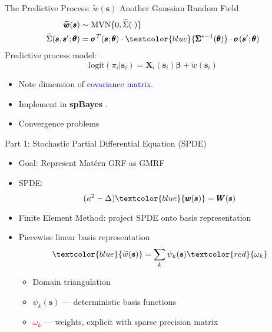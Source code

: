 \documentclass{beamer}
\begin{document}
\begin{frame}[fragile]{The Predictive Process: $\widetilde{w}(\pmb{s})$}
Another Gaussian Random Field
\begin{align*}
\widetilde{\pmb{w}}(\pmb{s}) &\sim \text{MVN}\{0, \widetilde{\Sigma}(\cdot)\} \\
\widetilde{\Sigma}(\pmb{s}, \pmb{s}'; \pmb{\theta}) &= \pmb{\sigma}^{T}(\pmb{s};\pmb{\theta}) \cdot \textcolor{blue}{\pmb{\Sigma}^{*-1}(\pmb{\theta})} \cdot \pmb{\sigma}(\pmb{s}';\pmb{\theta})
\end{align*}
Predictive process model:
    \begin{equation}
    \text{logit}(\pi_{i}|\pmb{s}_{i}) = \pmb{X}_{i}(\pmb{s}_{i}) \pmb{\beta} + \widetilde{w}(\pmb{s}_{i}) \nonumber
    \end{equation}
    \begin{itemize}
    \item Note dimension of \textcolor{blue}{covariance matrix}.
    \item Implement in {\bf spBayes} \citep{Finley2013}.
    \item Convergence problems
    \end{itemize}
\end{frame}

\begin{frame}{Part 1: Stochastic Partial Differential Equation (SPDE)}{\citep{Lindgren2011}}

\begin{itemize}
\addtolength{\itemsep}{0.5\baselineskip}
\item Goal: Represent Mat\'ern GRF as GMRF
\item SPDE:
$$ (\kappa^{2} - \Delta)\textcolor{blue}{\pmb{w}(\pmb{s})} = \pmb{W}(\pmb{s})$$
\item Finite Element Method: project SPDE onto basis representation
\item Piecewise linear basis representation
$$ \textcolor{blue}{\widetilde{w}(\pmb{s})} = \sum_{k} \psi_{k}(\pmb{s})\textcolor{red}{\omega_{k}}$$
        \begin{itemize}
        \addtolength{\itemsep}{0.5\baselineskip}
        \item Domain triangulation
        \item $\psi_{k}(\pmb{s})$ --- deterministic basis functions
        \item \textcolor{red}{$\omega_{k}$} --- weights, explicit with sparse precision matrix
        \end{itemize}
\end{itemize}

\end{frame}
\end{document}
